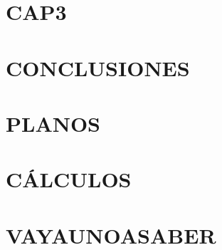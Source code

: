 \documentclass[12pt,a4paper,oneside]{report}
\begin{document}
	\chapter{CAP3}
	
	
	
	\chapter{CONCLUSIONES}
	
	
	
	\renewcommand*{\bibname}{REFERENCIA BIBLIOGRÁFICA}
	\newpage
	
	
	\setupname[ANEXO]
	
	 \appendix
	 \renewcommand{\thechapter}{\arabic{chapter}}
	 \setcounter{section}{0}
	 \chapter{PLANOS}
	 
	 \chapter{CÁLCULOS}
	 
	 \chapter{VAYAUNOASABER}
	 
\end{document}
